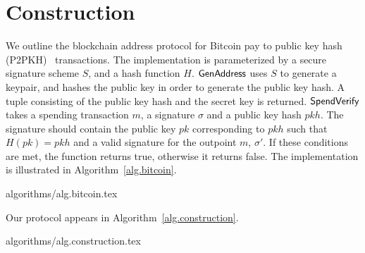 \section{Construction}\label{section:construction}

We outline the blockchain address protocol for Bitcoin pay to public key hash (P2PKH)~\cite{bitcoin-dev-guide} transactions. The implementation is parameterized by a secure signature scheme $S$, and a hash function $H$.
$\mathsf{GenAddress}$ uses $S$ to generate a keypair, and hashes the public key in order to generate the public key hash. A tuple consisting of the public key hash and the secret key is returned.
$\mathsf{SpendVerify}$ takes a spending transaction $m$, a signature $\sigma$ and a public key hash $pkh$. The signature should contain the public key $pk$ corresponding to $pkh$ such that $H(pk) = pkh$ and a valid signature for the outpoint $m$, $\sigma'$. If these conditions are met, the function returns true, otherwise it returns false.
The implementation is illustrated in Algorithm~\ref{alg.bitcoin}.

{algorithms/alg.bitcoin.tex}

Our protocol appears in Algorithm~\ref{alg.construction}.

{algorithms/alg.construction.tex}
